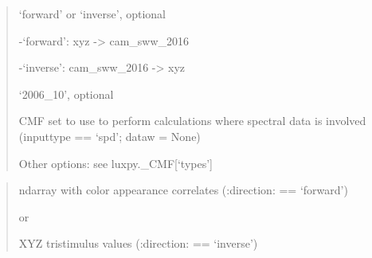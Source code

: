 \documentclass[letterpaper,10pt,english]{sphinxmanual}
\begin{document}
\begin{fulllineitems}
\begin{description}
\begin{quote}
\begin{description}
\item[{direction}] \leavevmode
\begin{DUlineblock}{0em}
\item[] ‘forward’ or ‘inverse’, optional
\item[]
\begin{DUlineblock}{\DUlineblockindent}
\item[] -‘forward’: xyz -\textgreater{} cam\_sww\_2016
\item[] -‘inverse’: cam\_sww\_2016 -\textgreater{} xyz 
\end{DUlineblock}
\end{DUlineblock}

\item[{cieobs}] \leavevmode
\begin{DUlineblock}{0em}
\item[] ‘2006\_10’, optional
\item[] CMF set to use to perform calculations where spectral data 
is involved (inputtype == ‘spd’; dataw = None)
\item[] Other options: see luxpy.\_CMF{[}‘types’{]}
\end{DUlineblock}

\end{description}\end{quote}

\item[{Returns:}] \leavevmode\begin{quote}\begin{description}
\item[{returns}] \leavevmode
\begin{DUlineblock}{0em}
\item[] ndarray with color appearance correlates (:direction: == ‘forward’)
\item[]
\begin{DUlineblock}{\DUlineblockindent}
\item[] or 
\end{DUlineblock}
\item[] XYZ tristimulus values (:direction: == ‘inverse’)
\end{DUlineblock}

\end{description}\end{quote}


\end{description}
\end{fulllineitems}
\end{document}
